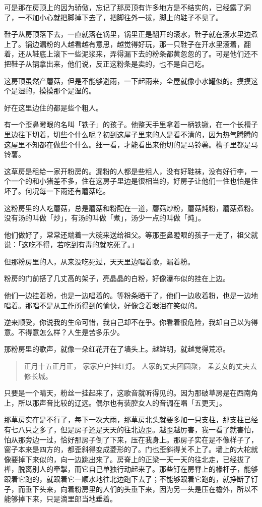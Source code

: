 \documentclass[UTF8]{ctexart}
\begin{document}
可是那在房顶上的因为骄傲，忘记了那房顶有许多地方是不结实的，已经露了洞了，一不加小心就把脚掉下去了，把脚往外一拔，脚上的鞋子不见了。

鞋子从房顶落下去，一直就落在锅里，锅里正是翻开的滚水，鞋子就在滚水里边煮上了。锅边漏粉的人越看越有意思，越觉得好玩，那一只鞋子在开水里滚着，翻着，还从鞋底上滚下一些泥浆来，弄得漏下去的粉条都黄忽忽的了。可是他们还不把鞋子从锅拿出来，他们说，反正这粉条是卖的，也不是自己吃。

这房顶虽然产蘑菇，但是不能够避雨，一下起雨来，全屋就像小水罐似的。摸摸这个是湿的，摸摸那个是湿的。

好在这里边住的都是些个粗人。

有一个歪鼻瞪眼的名叫「铁子」的孩子。他整天手里拿着一柄铁锹，在一个长槽子里边往下切着，切些个什么呢？初到这屋子里来的人是看不清的，因为热气腾腾的这屋里不知都在做些个什么。细一看，才能看出来他切的是马铃薯。槽子里都是马铃薯。

这草房是租给一家开粉房的。漏粉的人都是些粗人，没有好鞋袜，没有好行李，一个一个的和小猪差不多，住在这房子里边是很相当的，好房子让他们一住也怕是住坏了。何况每一下雨还有蘑菇吃。

这粉房里的人吃蘑菇，总是蘑菇和粉配在一道，蘑菇炒粉，蘑菇炖粉，蘑菇煮粉。没有汤的叫做「炒」，有汤的叫做「煮」，汤少一点的叫做「炖」。

他们做好了，常常还端着一大碗来送给祖父。等那歪鼻瞪眼的孩子一走了，祖父就说：「这吃不得，若吃到有毒的就吃死了。」

但那粉房里的人，从来没吃死过，天天里边唱着歌，漏着粉。

粉房的门前搭了几丈高的架子，亮晶晶的白粉，好像瀑布似的挂在上边。

他们一边挂着粉，也是一边唱着的。等粉条晒干了，他们一边收着粉，也是一边地唱着。那唱不是从工作所得到的愉快，好像含着眼泪在笑似的。

逆来顺受，你说我的生命可惜，我自己却不在乎。你看着很危险，我却自己以为得意。不得意怎么样？人生是苦多乐少。

那粉房里的歌声，就像一朵红花开在了墙头上。越鲜明，就越觉得荒凉。

\begin{verse}
    正月十五正月正，
    家家户户挂红灯。
    人家的丈夫团圆聚，
    孟姜女的丈夫去修长城。
\end{verse}

只要是一个晴天，粉丝一挂起来了，这歌音就听得见的。因为那破草房是在西南角上，所以那声音比较的辽远。偶尔也有装腔女人的音调在唱「五更天」。

那草房实在是不行了，每下一次大雨，那草房北头就要多加一只支柱，那支柱已经有七八只之多了，但是房子还是天天的往北边歪。越歪越厉害，我一看了就害怕，怕从那旁边一过，恰好那房子倒了下来，压在我身上。那房子实在是不像样子了，窗子本来是四方的，都歪斜得变成菱形的了。门也歪斜得关不上了。墙上的大柁就像要掉下来似的，向一边跳出来了。房脊上的正梁一天一天的往北走，已经拔了榫，脱离别人的牵掣，而它自己单独行动起来了。那些钉在房脊上的椽杆子，能够跟着它跑的，就跟着它一顺水地往北边跑下去了；不能够跟着它跑的，就挣断了钉子，而垂下头来，向着粉房里的人们的头垂下来，因为另一头是压在檐外，所以不能够掉下来，只是滴里郎当地垂着。
\end{document}
